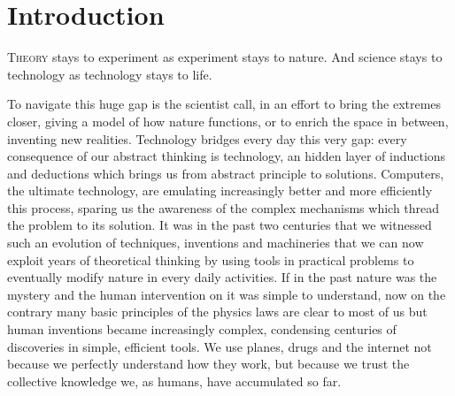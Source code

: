 \chapter{Introduction}




\lettrine{T}{heory} stays to experiment as experiment stays to nature. And science stays to technology as technology stays to life.

To navigate this huge gap is the scientist call, in an effort to bring the extremes closer, giving a model of how nature functions, or to enrich the space in between, inventing new realities. Technology bridges every day this very gap: every consequence of our abstract thinking is technology, an hidden layer of inductions and deductions which brings us from abstract principle to solutions. Computers, the ultimate technology, are emulating increasingly better and more efficiently this process, sparing us the awareness of the complex mechanisms which thread the problem to its solution. It was in the past two centuries that we witnessed such an evolution of techniques, inventions and machineries that we can now exploit years of theoretical thinking by using tools in practical problems to eventually modify nature in every daily activities. If in the past nature was the mystery and the human intervention on it was simple to understand, now on the contrary many basic principles of the physics laws are clear to most of us but human inventions became increasingly complex, condensing centuries of discoveries in simple, efficient tools. We use planes, drugs and the internet not because we perfectly understand how they work, but because we trust the collective knowledge we, as humans, have accumulated so far.


